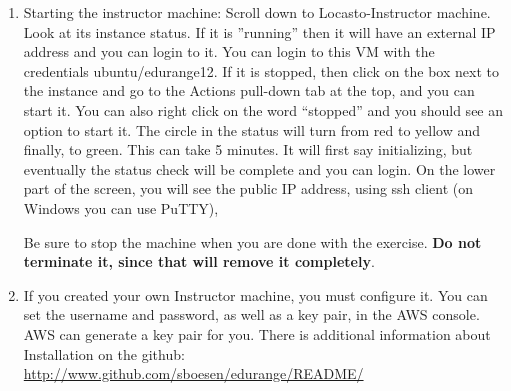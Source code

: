 \documentclass[11pt]{report}
\newcommand{\eat}[1]{}
\begin{document}
 \eat{one of the scenarios and run a script that will create and configure the VMs required for that
scenario.  }

\begin{enumerate}
  \item Starting the instructor machine:
    Scroll down to Locasto-Instructor machine.  Look at its instance status.
    If it is ''running'' then it will have an external IP address and you can login to it.
    You can login to this VM with the credentials  ubuntu/edurange12.  
    If it is stopped, then click on the box next to the instance and go to the Actions
    pull-down tab at the top, and you can start it.  You can also right click on the 
    word ``stopped'' and you 
    should see an option to start it.  The circle in the status will turn from red to yellow and finally, to
    green. This can take 5 minutes.
 It will first say initializing, but eventually the status check will be complete and
    you can login.  On the lower part of the screen, you will see the public IP address,
    using ssh client (on Windows you can use PuTTY), 
    
     Be sure to stop the machine when you are done with
     the exercise.  {\bf Do not terminate it, since that will remove it completely}.
  \item 
    If you created your own Instructor machine, you must configure it.  You can set the username 
    and password, as well as a key pair, in the AWS console.  AWS can generate a key pair for you.
    There is additional information about Installation on the github:
    \url{http://www.github.com/sboesen/edurange/README/  }


\end{enumerate}
\end{document}
